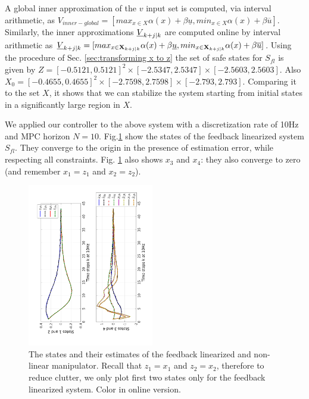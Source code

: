 A global inner approximation of the $v$ input set is computed, via interval arithmetic, as $V_{inner-global} = [max_{x\in X}\alpha(x) + \beta \underline{u}, min_{x\in X}\alpha(x) + \beta \overline{u}]$. 
Similarly, the inner approximations $\underline{V}_{k+j|k}$ are computed online by interval arithmetic as $\underline{V}_{k+j|k} = [max_{x\in \mathbf{X}_{k+j|k}} \alpha(x) + \beta \underline{u},  min_{x\in \mathbf{X}_{k+j|k}}\alpha(x) + \beta \overline{u}]$. 
Using the procedure of Sec. \ref{sec:transforming x to z} the set of safe states for $S_{fl}$ is given by $Z = [-0.5121, 0.5121]^2 \times [-2.5347, 2.5347] \times [-2.5603, 2.5603]$. Also $X_0 = [-0.4655,0.4655]^2 \times [-2.7598,2.7598] \times [-2.793,2.793]$. Comparing it to the set $X$, it shows that we can stabilize the system starting from initial states in a significantly large region in $X$.

We applied our controller to the above system with a discretization rate of 10Hz and MPC horizon $N=10$.
Fig.\ref{fig:AllStates_manip} show the states of the feedback linearized system $S_{fl}$. 
They converge to the origin in the presence of estimation error, while respecting all constraints.
Fig. \ref{fig:AllStates_manip} also shows $x_3$ and $x_4$: they also converge to zero (and remember $x_1 = z_1$ and $x_2 = z_2$).

\begin{figure}
\includegraphics[angle=270,width=0.49\textwidth]{figs/AllStates_manip.pdf}
\caption{The states and their estimates of the feedback linearized and non-linear manipulator. Recall that $z_1 = x_1$ and $z_2=x_2$, therefore to reduce clutter, we only plot first two states only for the feedback linearized system. Color in online version.}
\label{fig:AllStates_manip}
\end{figure}

